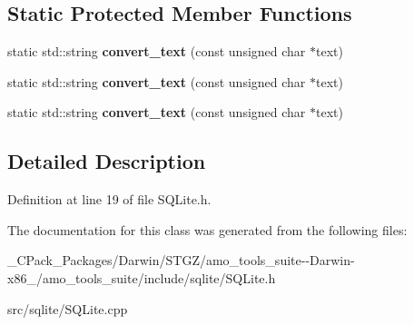 \subsection*{Static Protected Member Functions}
\begin{DoxyCompactItemize}
\item 
\mbox{\label{class_s_q_lite_wrapper_a46a46fe7c7b6887967540721368acd7c}} 
static std\+::string {\bfseries convert\+\_\+text} (const unsigned char $\ast$text)
\item 
\mbox{\label{class_s_q_lite_wrapper_a824d35be82b4e7771ad056886e4c88d5}} 
static std\+::string {\bfseries convert\+\_\+text} (const unsigned char $\ast$text)
\item 
\mbox{\label{class_s_q_lite_wrapper_a824d35be82b4e7771ad056886e4c88d5}} 
static std\+::string {\bfseries convert\+\_\+text} (const unsigned char $\ast$text)
\end{DoxyCompactItemize}


\subsection{Detailed Description}


Definition at line 19 of file S\+Q\+Lite.\+h.



The documentation for this class was generated from the following files\+:\begin{DoxyCompactItemize}
\item 
\+\_\+\+C\+Pack\+\_\+\+Packages/\+Darwin/\+S\+T\+G\+Z/amo\+\_\+tools\+\_\+suite-\/-\/\+Darwin-\/x86\+\_/amo\+\_\+tools\+\_\+suite/include/sqlite/S\+Q\+Lite.\+h\item 
src/sqlite/S\+Q\+Lite.\+cpp\end{DoxyCompactItemize}
